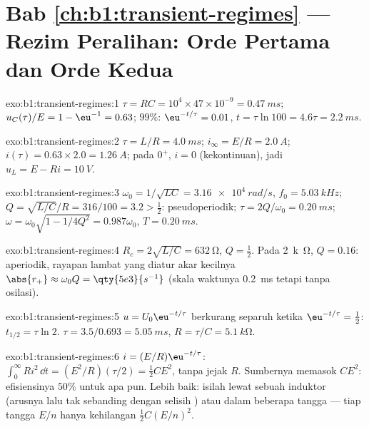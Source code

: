\section*{Bab \ref{ch:b1:transient-regimes} --- Rezim Peralihan: Orde Pertama dan Orde Kedua}

\begin{solution}{exo:b1:transient-regimes:1}
$\tau = RC = 10^4 \times 47\times10^{-9} = \qty{0.47}{ms}$; $u_C(\tau)/E
= 1 - \eu^{-1} = 0.63$; $99\%$: $\eu^{-t/\tau} = 0.01$, $t = \tau\ln 100
= 4.6\tau = \qty{2.2}{ms}$.
\end{solution}

\begin{solution}{exo:b1:transient-regimes:2}
$\tau = L/R = \qty{4.0}{ms}$; $i_\infty = E/R = \qty{2.0}{A}$; $i(\tau) =
0.63 \times 2.0 = \qty{1.26}{A}$; pada $0^+$, $i = 0$ (kekontinuan), jadi
$u_L = E - Ri = \qty{10}{V}$.
\end{solution}

\begin{solution}{exo:b1:transient-regimes:3}
$\omega_0 = 1/\sqrt{LC} = \qty{3.16e4}{rad/s}$, $f_0 = \qty{5.03}{kHz}$;
$Q = \sqrt{L/C}/R = 316/100 = 3.2 > \tfrac12$: pseudoperiodik;
$\tau = 2Q/\omega_0 = \qty{0.20}{ms}$; $\omega = \omega_0\sqrt{1 - 1/4Q^2}
= 0.987\omega_0$, $T = \qty{0.20}{ms}$.
\end{solution}

\begin{solution}{exo:b1:transient-regimes:4}
$R_c = 2\sqrt{L/C} = \qty{632}{\ohm}$, $Q = \tfrac12$. Pada \qty{2}{k\ohm},
$Q = 0.16$: aperiodik, rayapan lambat yang diatur akar kecilnya
$\abs{r_+} \approx \omega_0 Q = \qty{5e3}{s^{-1}}$ (skala waktunya
\qty{0.2}{ms} tetapi tanpa osilasi).
\end{solution}

\begin{solution}{exo:b1:transient-regimes:5}
$u = U_0\eu^{-t/\tau}$ berkurang separuh ketika $\eu^{-t/\tau} = \tfrac12$: $t_{1/2}
= \tau\ln 2$. $\tau = 3.5/0.693 = \qty{5.05}{ms}$, $R = \tau/C =
\qty{5.1}{k\ohm}$.
\end{solution}

\begin{solution}{exo:b1:transient-regimes:6}
$i = (E/R)\eu^{-t/\tau}$: $\int_0^\infty Ri^2\,\dd t = (E^2/R)(\tau/2) =
\tfrac12 CE^2$, tanpa jejak $R$. Sumbernya memasok $CE^2$: efisiensinya
$50\%$ untuk  apa pun. Lebih baik: isilah lewat sebuah induktor
(arusnya lalu tak sebanding dengan selisih ) atau dalam
beberapa tangga  --- tiap tangga $E/n$ hanya kehilangan $\tfrac12 C(E/n)^2$.
\end{solution}


